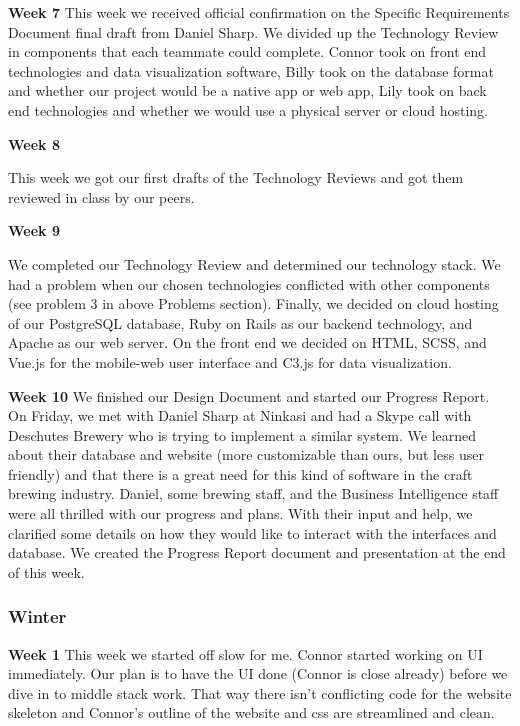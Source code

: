 \noindent\medskip\textbf{Week 7}
This week we received official confirmation on the Specific Requirements Document final draft from Daniel Sharp.
We divided up the Technology Review in components that each teammate could complete.
Connor took on front end technologies and data visualization software, Billy took on the database format and whether our project would be a native app or web app, Lily took on back end technologies and whether we would use a physical server or cloud hosting.

\noindent\medskip\textbf{Week 8}

This week we got our first drafts of the Technology Reviews and got them reviewed in class by our peers.

\noindent\medskip\textbf{Week 9}

We completed our Technology Review and determined our technology stack.
We had a problem when our chosen technologies conflicted with other components (see problem 3 in above Problems section).
Finally, we decided on cloud hosting of our PostgreSQL database, Ruby on Rails as our backend technology, and Apache as our web server.
On the front end we decided on HTML, SCSS, and Vue.js for the mobile-web user interface and C3.js for data visualization.

\noindent\medskip\textbf{Week 10}
We finished our Design Document and started our Progress Report.
On Friday, we met with Daniel Sharp at Ninkasi and had a Skype call with Deschutes Brewery who is trying to implement a similar system.
We learned about their database and website (more customizable than ours, but less user friendly) and that there is a great need for this kind of software in the craft brewing industry.
Daniel, some brewing staff, and the Business Intelligence staff were all thrilled with our progress and plans.
With their input and help, we clarified some details on how they would like to interact with the interfaces and database.
We created the Progress Report document and presentation at the end of this week.

\subsubsection{Winter}
\hfill\break
\noindent\medskip\textbf{Week 1}
This week we started off slow for me.
Connor started working on UI immediately.
Our plan is to have the UI done (Connor is close already) before we dive in to middle stack work.
That way there isn’t conflicting code for the website skeleton and Connor’s outline of the website and css are streamlined and clean.

